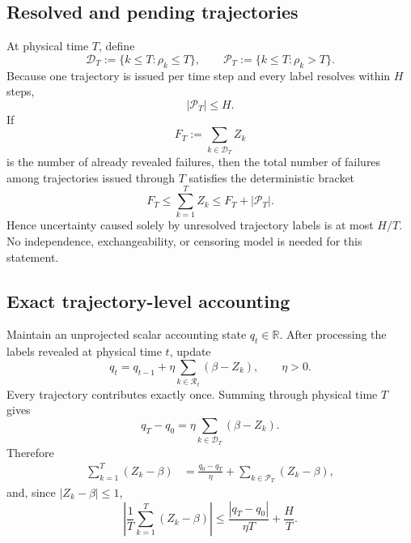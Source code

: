 \documentclass[11pt]{article}
\newcommand{\RR}{\mathbb{R}}
\begin{document}
\subsection{Resolved and pending trajectories}

At physical time $T$, define
\[
    \mathcal D_T:=\{k\le T:\rho_k\le T\},
    \qquad
    \mathcal P_T:=\{k\le T:\rho_k>T\}.
\]
Because one trajectory is issued per time step and every label resolves within
$H$ steps,
\begin{equation}
    |\mathcal P_T|\le H.
    \label{eq:pending-bound}
\end{equation}
If
\[
    F_T:=\sum_{k\in\mathcal D_T}Z_k
\]
is the number of already revealed failures, then the total number of failures
among trajectories issued through $T$ satisfies the deterministic bracket
\begin{equation}
    \boxed{
    F_T
    \le
    \sum_{k=1}^T Z_k
    \le
    F_T+|\mathcal P_T|.
    }
    \label{eq:censoring-bracket}
\end{equation}
Hence uncertainty caused solely by unresolved trajectory labels is at most
$H/T$.  No independence, exchangeability, or censoring model is needed for this
statement.

\subsection{Exact trajectory-level accounting}

Maintain an unprojected scalar accounting state $q_t\in\RR$.  After processing
the labels revealed at physical time $t$, update
\begin{equation}
    q_t
    =
    q_{t-1}
    +
    \eta
    \sum_{k\in\mathcal R_t}
    (\beta-Z_k),
    \qquad \eta>0.
    \label{eq:accounting-update}
\end{equation}
Every trajectory contributes exactly once.  Summing through physical time $T$
gives
\begin{equation}
    q_T-q_0
    =
    \eta
    \sum_{k\in\mathcal D_T}(\beta-Z_k).
    \label{eq:resolved-telescope}
\end{equation}
Therefore
\begin{align}
    \sum_{k=1}^T(Z_k-\beta)
    &=
    \frac{q_0-q_T}{\eta}
    +
    \sum_{k\in\mathcal P_T}(Z_k-\beta),
    \label{eq:full-calibration-decomposition}
\end{align}
and, since $|Z_k-\beta|\le1$,
\begin{equation}
    \boxed{
    \left|
        \frac1T\sum_{k=1}^T(Z_k-\beta)
    \right|
    \le
    \frac{|q_T-q_0|}{\eta T}
    +
    \frac HT.
    }
    \label{eq:right-censored-calibration-bound}
\end{equation}
\end{document}
